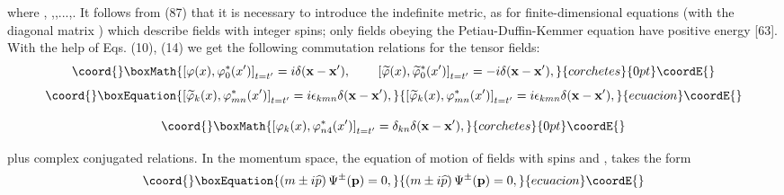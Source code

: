 \documentclass[a4paper,12pt]{article}
\begin{document}
where \coordHE{}, \coordHE{},\coordHE{},...,\coordHE{}. It follows from (87) that it is
necessary to introduce the indefinite metric, as for
finite-dimensional equations (with the diagonal matrix \coordHE{}) which describe fields with integer spins; only fields obeying
the Petiau-Duffin-Kemmer equation have positive energy [63]. With
the help of Eqs. (10), (14) we get the following commutation
relations for the tensor fields:
\[\coord{}\boxMath{
\left[ \varphi (x),\varphi _0^{*}(x^{\prime })\right]
_{t=t^{\prime }}=i\delta (\mathbf{x}-\mathbf{x}^{\prime }) ,
\hspace{0.3in}\left[ \widetilde{ \varphi }(x),\widetilde{\varphi
}_0^{*}(x^{\prime })\right] _{t=t^{\prime }}=-i\delta
(\mathbf{x}-\mathbf{x}^{\prime }) ,
}{corchetes}{0pt}\coordE{}\]
\begin{equation}\coord{}\boxEquation{
\left[ \widetilde{\varphi }_k(x),\varphi _{mn}^{*}(x^{\prime
})\right] _{t=t^{\prime }}=i\epsilon _{kmn}\delta
(\mathbf{x}-\mathbf{x}^{\prime }) ,\label{88}
}{
\left[ \widetilde{\varphi }_k(x),\varphi _{mn}^{*}(x^{\prime
})\right] _{t=t^{\prime }}=i\epsilon _{kmn}\delta
(\mathbf{x}-\mathbf{x}^{\prime }) ,}{ecuacion}\coordE{}\end{equation}

\[\coord{}\boxMath{
\left[ \varphi _k(x),\varphi _{n4}^{*}(x^{\prime })\right]
_{t=t^{\prime }}=\delta _{kn}\delta (\mathbf{x}-\mathbf{x}^{\prime
}) ,
}{corchetes}{0pt}\coordE{}\]

plus complex conjugated relations. In the momentum space, the equation of
motion of fields with spins \coordHE{} and \coordHE{}, takes the form
\begin{equation}\coord{}\boxEquation{
\left( m\pm i\widehat{p}\right) \Psi ^{\pm }(\mathbf{p})=0
,\label{89}
}{
\left( m\pm i\widehat{p}\right) \Psi ^{\pm }(\mathbf{p})=0
,}{ecuacion}\coordE{}\end{equation}
\end{document}
